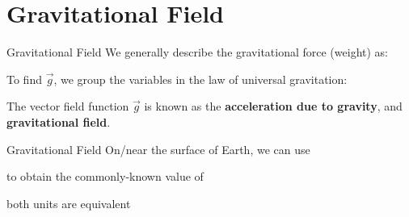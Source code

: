 \documentclass[12pt,compress,aspectratio=169]{beamer}
\begin{document}
\section{Gravitational Field}

\begin{frame}{Gravitational Field}
  We generally describe the gravitational force (weight) as:
  

  To find $\vec g$, we group the variables in the law of universal gravitation:
    

  The vector field function $\vec g$ is known as the \textbf{acceleration due
    to gravity}, and \textbf{gravitational field}.
\end{frame}



\begin{frame}{Gravitational Field}
  On/near the surface of Earth, we can use

  
  to obtain the commonly-known value of


  both units are equivalent
\end{frame}
\end{document}
